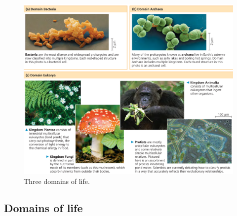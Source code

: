 \documentclass[ignorenonframetext,aspectratio=169]{beamer}
\begin{document}
\begin{frame}{}
\protect\hypertarget{section-2}{}

\begin{figure}
\includegraphics[width=0.55\linewidth]{./../images/three_domains_life} \caption{Three domains of life.}\label{fig:domains-life}
\end{figure}

\end{frame}

\hypertarget{domains-of-life}{%
\subsection{Domains of life}\label{domains-of-life}}
\end{document}
